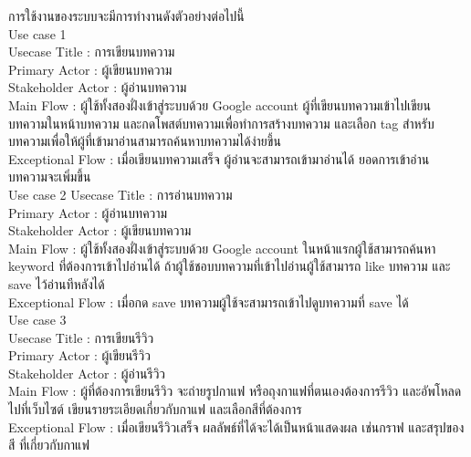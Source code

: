 การใช้งานของระบบจะมีการทำงานดังตัวอย่างต่อไปนี้ \\ 
Use case 1 \\ 
Usecase Title : การเขียนบทความ\\
Primary Actor : ผู้เขียนบทความ\\
Stakeholder Actor : ผู้อ่านบทความ\\
Main Flow : ผู้ใช้ทั้งสองฝั่งเข้าสู่ระบบด้วย Google account ผู้ที่เขียนบทความเข้าไปเขียนบทความในหน้าบทความ และกดโพสต์บทความเพื่อทำการสร้างบทความ และเลือก tag สำหรับบทความเพื่อให้ผู้ที่เข้ามาอ่านสามารถค้นหาบทความได้ง่ายขึ้น\\
Exceptional Flow : เมื่อเขียนบทความเสร็จ ผู้อ่านจะสามารถเข้ามาอ่านได้ ยอดการเข้าอ่านบทความจะเพิ่มขึ้น\\
Use case 2
Usecase Title : การอ่านบทความ\\
Primary Actor : ผู้อ่านบทความ\\
 Stakeholder Actor : ผู้เขียนบทความ\\
Main Flow : ผู้ใช้ทั้งสองฝั่งเข้าสู่ระบบด้วย Google account ในหน้าแรกผู้ใช้สามารถค้นหา keyword ที่ต้องการเข้าไปอ่านได้ ถ้าผู้ใช้ชอบบทความที่เข้าไปอ่านผู้ใช้สามารถ like บทความ และ save ไว้อ่านทีหลังได้\\
 Exceptional Flow : เมื่อกด save บทความผู้ใช้จะสามารถเข้าไปดูบทความที่ save ได้\\
Use case 3\\
Usecase Title : การเขียนรีวิว\\
Primary Actor : ผู้เขียนรีวิว\\
 Stakeholder Actor : ผู้อ่านรีวิว\\
Main Flow : ผู้ที่ต้องการเขียนรีวิว จะถ่ายรูปกาแฟ หรือถุงกาแฟที่ตนเองต้องการรีวิว และอัพโหลดไปที่เว็บไซต์ เขียนรายระเอียดเกี่ยวกับกาแฟ และเลือกสีที่ต้องการ \\
 Exceptional Flow : เมื่อเขียนรีวิวเสร็จ ผลลัพธ์ที่ได้จะได้เป็นหน้าแสดงผล เช่นกราฟ และสรุปของสี ที่เกี่ยวกับกาแฟ\\

